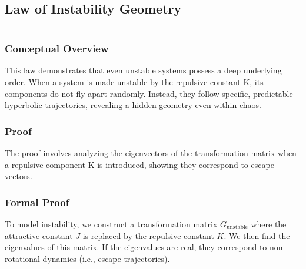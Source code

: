 \subsection*{Law of Instability Geometry}
\hrule
\vspace{0.3cm}
\vspace{0.5cm}

\subsubsection*{Conceptual Overview}
This law demonstrates that even unstable systems possess a deep underlying order. When a system is made unstable by the repulsive constant K, its components do not fly apart randomly. Instead, they follow specific, predictable hyperbolic trajectories, revealing a hidden geometry even within chaos.

\subsubsection*{Proof}
The proof involves analyzing the eigenvectors of the transformation matrix when a repulsive component K is introduced, showing they correspond to escape vectors.

\subsubsection*{Formal Proof}
To model instability, we construct a transformation matrix $G_{\text{unstable}}$ where the attractive constant $J$ is replaced by the repulsive constant $K$. We then find the eigenvalues of this matrix. If the eigenvalues are real, they correspond to non-rotational dynamics (i.e., escape trajectories).

